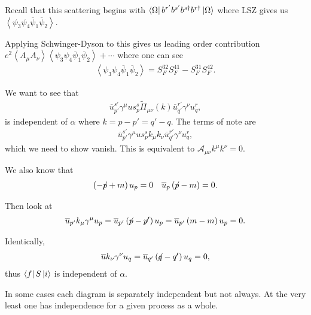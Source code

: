 
Recall that this scattering begins with $\bra{\Omega} b^{r'} b^{s'} b^{s\dagger} b^{r\dagger} \ket{\Omega}$ where LSZ gives us $\left< \psi_3 \psi_4 \overline{\psi}_1 \overline{\psi}_2 \right>$. 

Applying Schwinger-Dyson to this gives us leading order contribution $e^2 \left< A_\mu A_\nu \right> \left< \psi_3 \psi_4 \overline{\psi}_1 \overline{\psi}_2 \right> + \cdots$ where one can see
\begin{align}
    \left<\psi_3 \psi_4 \overline{\psi}_1 \overline{\psi}_2 \right>  = S_F^{32} S_F^{41} - S_F^{31} S_F^{42}
.\end{align}

We want to see that
\begin{align}
    \overline{u}^{s'}_{p'} \gamma^{\mu} us^{s}_p \widetilde{\Pi}_{\mu \nu} \left( k \right) \overline{u}^{r'}_{q'} \gamma^{\nu} u^{r}_q 
,\end{align}
is independent of $\alpha$ where $k = p - p' = q' - q$. The terms of note are 
\begin{align}
    \overline{u}^{s'}_{p'} \gamma^{\mu} us^{s}_p k_\mu k_\nu \overline{u}^{r'}_{q'} \gamma^{\nu} u^{r}_q 
,\end{align}
which we need to show vanish. This is equivalent to $\mathcal{A}_{\mu \nu} k^{\mu} k^{\nu} = 0$.

We also know that
\begin{align}
    \left( - \fbs{p} + m \right) u_p = 0 && \overline{u}_p \left( \fbs{p} - m \right) = 0
.\end{align}

Then look at
\begin{align}
    \overline{u}_{p'} k_\mu \gamma^{\mu} u_p = \overline{u}_{p'} \left( \fbs{p} -\fbs{p'} \right) u_p = \overline{u}_{p'} \left( m - m \right) u_p = 0
.\end{align}

Identically,
\begin{align}
    \overline{u} k_\nu \gamma^{\nu} u_q = \overline{u}_{q'} \left( \fbs{q} - \fbs{q'} \right) u_q = 0
,\end{align}
thus $\bra{f} S \ket{i}$ is independent of $\alpha$.

\begin{note}
    In some cases each diagram is separately independent but not always. At the very least one has independence for a given process as a whole.
\end{note}

